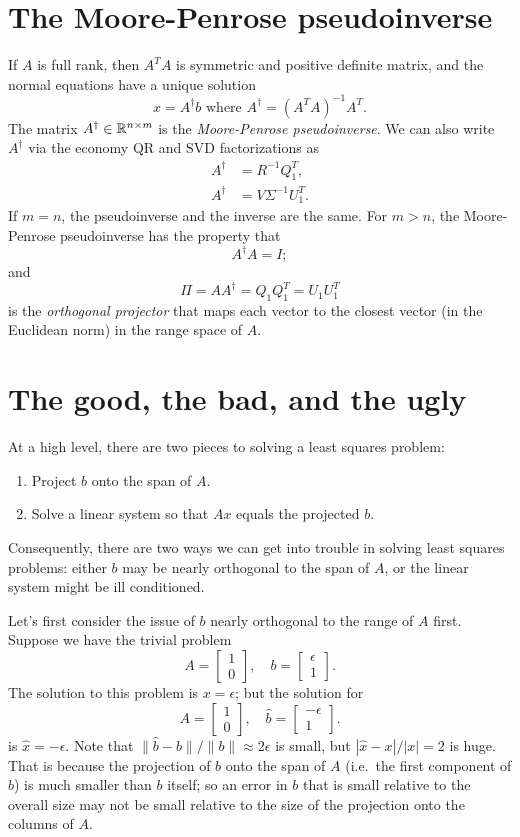 \documentclass[12pt, leqno]{article}
\begin{document}
\section*{The Moore-Penrose pseudoinverse}

If $A$ is full rank, then $A^T A$ is symmetric and positive definite
matrix, and the normal equations have a unique solution
\[
  x = A^{\dagger} b \mbox{ where } A^{\dagger} = (A^T A)^{-1} A^T.
\]
The matrix $A^\dagger \in \mathbb{R}^{n \times m}$ is the
{\em Moore-Penrose pseudoinverse}.  We can also write $A^\dagger$
via the economy QR and SVD factorizations as
\begin{align*}
  A^\dagger &= R^{-1} Q_1^T, \\
  A^\dagger &= V \Sigma^{-1} U_1^T.
\end{align*}
If $m = n$, the pseudoinverse and the inverse are
the same.  For $m > n$, the Moore-Penrose pseudoinverse
has the property that
\[
  A^\dagger A = I;
\]
and
\[
  \Pi = A A^\dagger = Q_1 Q_1^T = U_1 U_1^T
\]
is the {\em orthogonal projector} that maps each vector to the
closest vector (in the Euclidean norm) in the range space of $A$.

\section*{The good, the bad, and the ugly}

At a high level, there are two pieces to solving a least squares
problem:
\begin{enumerate}
\item Project $b$ onto the span of $A$.
\item Solve a linear system so that $Ax$ equals the projected $b$.
\end{enumerate}
Consequently, there are two ways we can get into trouble in solving
least squares problems: either $b$ may be nearly orthogonal to the
span of $A$, or the linear system might be ill conditioned.

Let's first consider the issue of $b$ nearly orthogonal to the
range of $A$ first.  Suppose we have the trivial problem
\[
A = \begin{bmatrix} 1 \\ 0 \end{bmatrix}, \quad
b = \begin{bmatrix} \epsilon \\ 1 \end{bmatrix}.
\]
The solution to this problem is $x = \epsilon$; but the solution for
\[
A = \begin{bmatrix} 1 \\ 0 \end{bmatrix}, \quad
\hat b = \begin{bmatrix} -\epsilon \\ 1 \end{bmatrix}.
\]
is $\hat x = -\epsilon$.  Note that $\|\hat b-b\|/\|b\| \approx 2
\epsilon$ is small, but $|\hat x - x|/|x| = 2$ is huge.  That is
because the projection of $b$ onto the span of $A$ (i.e.~the first
component of $b$) is much smaller than $b$ itself; so an error in $b$
that is small relative to the overall size may not be small relative
to the size of the projection onto the columns of $A$.
\end{document}

